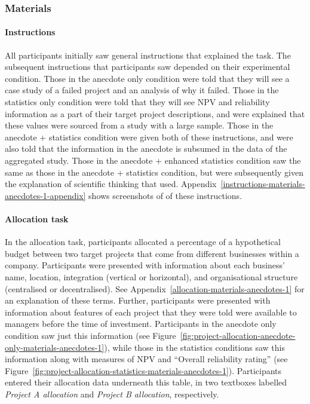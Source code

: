 \documentclass[a4paper, nobind, dvipsnames]{templates/ociamthesis}
\theoremstyle{definition}
\theoremstyle{definition}
\theoremstyle{definition}
\theoremstyle{definition}
\theoremstyle{remark}
\begin{document}
\hypertarget{materials-anecdotes-1}{%
\subsubsection{Materials}\label{materials-anecdotes-1}}

\paragraph{Instructions}

All participants initially saw general instructions that explained the task. The
subsequent instructions that participants saw depended on their experimental
condition. Those in the anecdote only condition were told that they will see a
case study of a failed project and an analysis of why it failed. Those in the
statistics only condition were told that they will see NPV and reliability
information as a part of their target project descriptions, and were explained
that these values were sourced from a study with a large sample. Those in the
anecdote + statistics condition were given both of these instructions, and were
also told that the information in the anecdote is subsumed in the data of the
aggregated study. Those in the anecdote + enhanced statistics condition saw the
same as those in the anecdote + statistics condition, but were subsequently
given the explanation of scientific thinking that \textcite{wainberg2018} used.
Appendix~\ref{instructions-materials-anecdotes-1-appendix} shows screenshots of
of these instructions.

\paragraph{Allocation task}

In the allocation task, participants allocated a percentage of a hypothetical
budget between two target projects that come from different businesses within a
company. Participants were presented with information about each business' name,
location, integration (vertical or horizontal), and organisational structure
(centralised or decentralised). See
Appendix~\ref{allocation-materials-anecdotes-1} for an explanation of these
terms. Further, participants were presented with information about features of
each project that they were told were available to managers before the time of
investment. Participants in the anecdote only condition saw just this
information (see
Figure~\ref{fig:project-allocation-anecdote-only-materials-anecdotes-1}), while
those in the statistics conditions saw this information along with measures of
NPV and ``Overall reliability rating'' (see
Figure~\ref{fig:project-allocation-statistics-materials-anecdotes-1}).
Participants entered their allocation data underneath this table, in two
textboxes labelled \emph{Project A allocation} and \emph{Project B allocation},
respectively.
\end{document}

